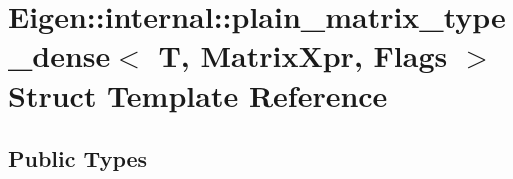 \hypertarget{struct_eigen_1_1internal_1_1plain__matrix__type__dense_3_01_t_00_01_matrix_xpr_00_01_flags_01_4}{}\section{Eigen\+:\+:internal\+:\+:plain\+\_\+matrix\+\_\+type\+\_\+dense$<$ T, Matrix\+Xpr, Flags $>$ Struct Template Reference}
\label{struct_eigen_1_1internal_1_1plain__matrix__type__dense_3_01_t_00_01_matrix_xpr_00_01_flags_01_4}
\subsection*{Public Types}
